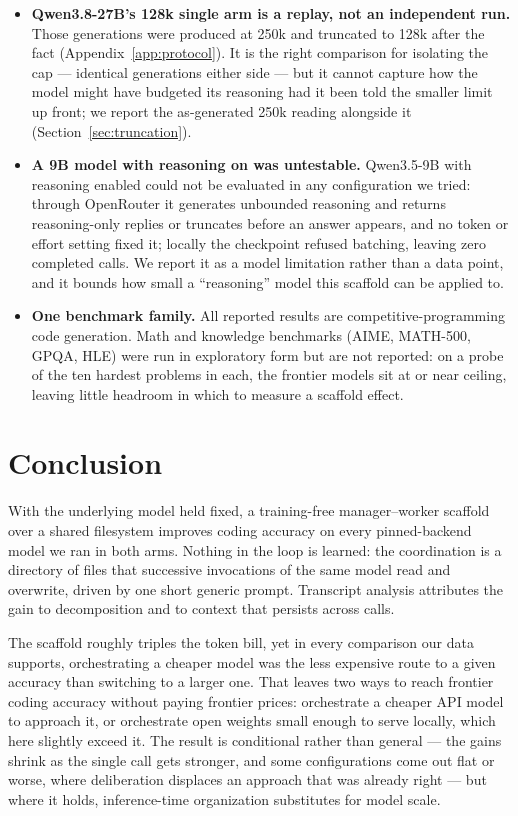 \documentclass{article}
\begin{document}
\begin{itemize}
  \item \textbf{Qwen3.8-27B's 128k single arm is a replay, not an independent run.} Those
  generations were produced at 250k and truncated to 128k after the fact
  (Appendix~\ref{app:protocol}). It is the right comparison for isolating the cap --- identical
  generations either side --- but it cannot capture how the model might have budgeted its
  reasoning had it been told the smaller limit up front; we report the as-generated 250k reading
  alongside it (Section~\ref{sec:truncation}).

  \item \textbf{A 9B model with reasoning on was untestable.} Qwen3.5-9B with reasoning enabled
  could not be evaluated in any configuration we tried: through OpenRouter it generates unbounded
  reasoning and returns reasoning-only replies or truncates before an answer appears, and no token
  or effort setting fixed it; locally the checkpoint refused batching, leaving zero completed
  calls. We report it as a model limitation rather than a data point, and it bounds how small a
  ``reasoning'' model this scaffold can be applied to.

  \item \textbf{One benchmark family.} All reported results are competitive-programming code
  generation. Math and knowledge benchmarks (AIME, MATH-500, GPQA, HLE) were run in exploratory
  form but are not reported: on a probe of the ten hardest problems in each, the frontier models
  sit at or near ceiling, leaving little headroom in which to measure a scaffold effect.
\end{itemize}

\section{Conclusion}
\label{sec:conclusion}

With the underlying model held fixed, a training-free manager--worker scaffold over a shared
filesystem improves coding accuracy on every pinned-backend model we ran in both arms. Nothing
in the loop is learned: the coordination is a directory of files that successive invocations of
the same model read and overwrite, driven by one short generic prompt. Transcript analysis
attributes the gain to decomposition and to context that persists across calls.

The scaffold roughly triples the token bill, yet in every comparison our data supports,
orchestrating a cheaper model was the less expensive route to a given accuracy than switching to
a larger one. That leaves two ways to reach frontier coding accuracy without paying frontier
prices: orchestrate a cheaper API model to approach it, or orchestrate open weights small enough
to serve locally, which here slightly exceed it. The result is conditional rather than general --- the gains shrink as the single call
gets stronger, and some configurations come out flat or worse, where deliberation displaces an
approach that was already right --- but where it holds, inference-time organization substitutes
for model scale.
\end{document}
